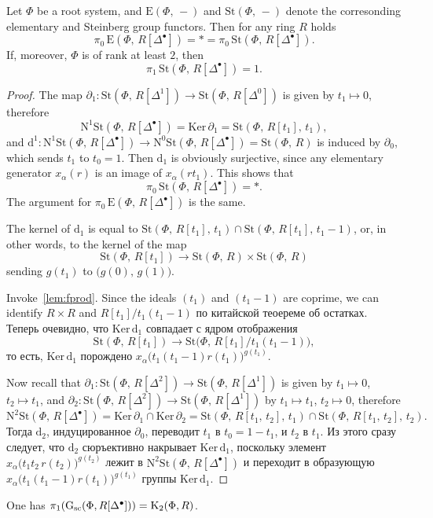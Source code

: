 \documentclass[oneside, 11pt]{amsart}
\begin{document}
\begin{lemma}
Let $\Phi$ be a root system, and $\mathrm E(\Phi,\,-)$ and $\mathrm{St}(\Phi,\,-)$ denote the corresonding elementary and Steinberg group functors. Then for any ring $R$ holds $$\pi_0\,\mathrm E(\Phi,\,R[\Delta^\bullet])=*=\pi_0\,\mathrm{St}(\Phi,\,R[\Delta^\bullet]).$$ If, moreover, $\Phi$ is of rank at least $2$, then $$\pi_1\,\mathrm{St}(\Phi,\,R[\Delta^\bullet])=1.$$
\end{lemma}
\begin{proof}
The map $\partial_1\colon\mathrm{St}(\Phi,\,R[\Delta^1])\rightarrow\mathrm{St}(\Phi,\,R[\Delta^0])$ is given by $t_1\mapsto0$, therefore 
$$\mathrm N^1\mathrm{St}(\Phi,\,R[\Delta^\bullet])=\mathrm{Ker}\,\partial_1=\mathrm{St}(\Phi,\,R[t_1],\,t_1),$$
and $\mathrm d^1\colon\mathrm N^1\mathrm{St}(\Phi,\,R[\Delta^\bullet])\rightarrow\mathrm N^0\mathrm{St}(\Phi,\,R[\Delta^\bullet])=\mathrm{St}(\Phi,\,R)$ is induced by $\partial_0$, which sends $t_1$ to $t_0=1$. %
Then $\mathrm d_1$ is obviously surjective, since any elementary generator $x_\alpha(r)$ is an image of $x_\alpha(rt_1)$. This shows that $$\pi_0\,\mathrm{St}(\Phi,\,R[\Delta^\bullet])=*.$$ The argument for $\pi_0\,\mathrm E(\Phi,\,R[\Delta^\bullet])$ is the same.

The kernel of $\mathrm d_1$ is equal to $\mathrm{St}(\Phi,\,R[t_1],\,t_1)\cap\mathrm{St}(\Phi,\,R[t_1],\,t_1-1)$, or, in other words, to the kernel of the map
$$
\mathrm{St}(\Phi,\,R[t_1])\rightarrow\mathrm{St}(\Phi,\,R)\times\mathrm{St}(\Phi,\,R)
$$
sending $g(t_1)$ to $\big(g(0),\,g(1)\big)$. 

Invoke~\cref{lem:fprod}.
Since the ideals $(t_1)$ and $(t_1-1)$ are coprime, we can identify $R\times R$ and $R[t_1]/t_1(t_1-1)$ по китайской теоереме об остатках. Теперь очевидно, что $\mathrm{Ker}\,\mathrm d_1$ совпадает с ядром отображения
$$
\mathrm{St}(\Phi,\,R[t_1])\rightarrow\mathrm{St}\big(\Phi,\,R[t_1]/t_1(t_1-1)\big),
$$
то есть, $\mathrm{Ker}\,\mathrm d_1$ порождено $x_{\alpha}\big(t_1(t_1-1)r(t_1)\big)^{g(t_1)}$.

Now recall that $\partial_1\colon\mathrm{St}(\Phi,\,R[\Delta^2])\rightarrow\mathrm{St}(\Phi,\,R[\Delta^1])$ is given by $t_1\mapsto0$, $t_2\mapsto t_1$, and $\partial_2\colon\mathrm{St}(\Phi,\,R[\Delta^2])\rightarrow\mathrm{St}(\Phi,\,R[\Delta^1])$ by $t_1\mapsto t_1$, $t_2\mapsto0$, therefore
$$
\mathrm N^2\mathrm{St}(\Phi,\,R[\Delta^\bullet])=\mathrm{Ker}\,\partial_1\cap\mathrm{Ker}\,\partial_2=\mathrm{St}(\Phi,\,R[t_1,\,t_2],\,t_1)\cap\mathrm{St}(\Phi,\,R[t_1,\,t_2],\,t_2).
$$
Тогда $\mathrm d_2$, индуцированное $\partial_0$, переводит $t_1$ в $t_0=1-t_1$, и $t_2$ в $t_1$. Из этого сразу следует, что $\mathrm d_2$ сюръективно накрывает $\mathrm{Ker}\,\mathrm d_1$, поскольку элемент $x_{\alpha}\big(t_1t_2\,r(t_2)\big)^{g(t_2)}$ лежит в $\mathrm N^2\mathrm{St}(\Phi,\,R[\Delta^\bullet])$ и переходит в образующую $x_{\alpha}\big(t_1(t_1-1)r(t_1)\big)^{g(t_1)}$ группы $\mathrm{Ker}\,\mathrm d_1$.
\end{proof}

\begin{theorem} \label{theorem:pi1-GRDelta}
 One has $\pi_1(\mathrm{G}_\mathrm{sc}(\Phi, R[\Delta^\bullet])) = {\mathrm{K}}_2(\Phi, R)$.
\end{theorem}


\printbibliography
\end{document}

